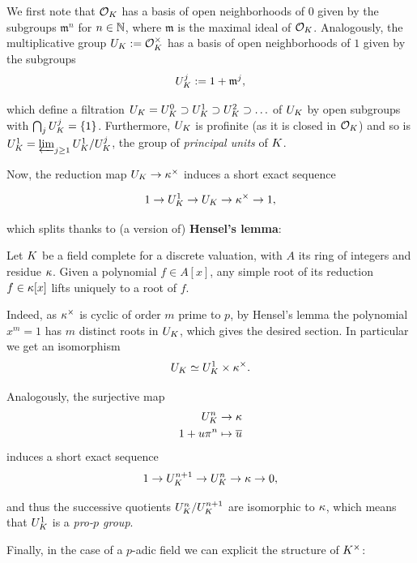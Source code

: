 \documentclass[a4paper, oneside]{memoir}
\begin{document}
We first note that $\mathcal{O}_K$ has a basis of open neighborhoods of $0$ given by the subgroups $\mathfrak{m}^n$ for $n\in\mathbb{N}$, where $\mathfrak{m}$ is the maximal ideal of $\mathcal{O}_K$. Analogously, the multiplicative group $U_K:=\mathcal{O}_K^\times$ has a basis of open neighborhoods of $1$ given by the subgroups
\[
    U_K^j:=1+\mathfrak{m}^j,
\]

which define a filtration $U_K = U_K^0\supset U_K^1\supset U_K^2\supset\ldots$ of $U_K$ by open subgroups with $\bigcap_j{U_K^j}=\{1\}$. Furthermore, $U_K$ is profinite (as it is closed in $\mathcal{O}_K$) and so is $U_K^1=\varprojlim_{j\geq 1}{U_K^1 / U_K^j}$, the group of \textit{principal units} of $K$.

Now, the reduction map $U_K\to \kappa^\times$ induces a short exact sequence

\[
    1\to U_K^1\to U_K\to \kappa^\times \to 1,
\]

which splits thanks to (a version of) \textbf{Hensel's lemma}:

\begin{proposition}
    Let $K$ be a field complete for a discrete valuation, with $A$ its ring of integers and residue $\kappa$.
    Given a polynomial $f\in A[x]$, any simple root of its reduction $f\in \kappa[x]$ lifts uniquely to a root of $f$.
\end{proposition}

Indeed, as $\kappa^\times$ is cyclic of order $m$ prime to $p$, by Hensel's lemma the polynomial $x^m=1$ has $m$ distinct roots in $U_K$, which gives the desired section. In particular we get an isomorphism
\begin{equation}\label{eq:UK}
    U_K\simeq U_K^1\times\kappa^\times.
\end{equation}

Analogously, the surjective map
\begin{align*}
    U_K^n       & \to \kappa               \\
    1 + u \pi ^n & \mapsto \overline{u}
\end{align*}
induces a short exact sequence
\[
    1\to U_K^{n+1} \to U_K^n\to \kappa\to 0,
\]

and thus the successive quotients $U_K^n/U_K^{n+1}$ are isomorphic to $\kappa$, which means that $U_K^1$ is a \textit{pro-$p$ group}.

Finally, in the case of a $p$-adic field we can explicit the structure of $K^\times$:
\end{document}
